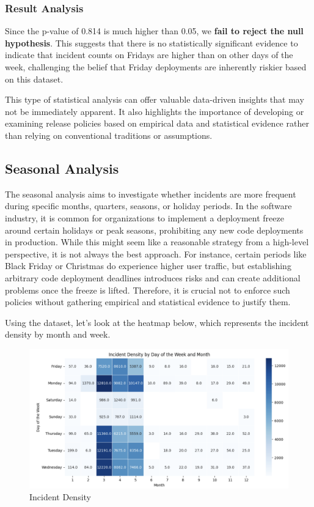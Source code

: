 \documentclass{article}
\begin{document}
\subsubsection{Result Analysis}

Since the p-value of 0.814 is much higher than 0.05, we \textbf{fail to reject the null hypothesis}. This suggests that there is no statistically significant evidence to indicate that incident counts on Fridays are higher than on other days of the week, challenging the belief that Friday deployments are inherently riskier based on this dataset. 

This type of statistical analysis can offer valuable data-driven insights that may not be immediately apparent. It also highlights the importance of developing or examining release policies based on empirical data and statistical evidence rather than relying on conventional traditions or assumptions.

\subsection{Seasonal Analysis}

The seasonal analysis aims to investigate whether incidents are more frequent during specific months, quarters, seasons, or holiday periods. In the software industry, it is common for organizations to implement a deployment freeze around certain holidays or peak seasons, prohibiting any new code deployments in production. While this might seem like a reasonable strategy from a high-level perspective, it is not always the best approach. For instance, certain periods like Black Friday or Christmas do experience higher user traffic, but establishing arbitrary code deployment deadlines introduces risks and can create additional problems once the freeze is lifted. Therefore, it is crucial not to enforce such policies without gathering empirical and statistical evidence to justify them.

Using the dataset, let's look at the heatmap below, which represents the incident density by month and week. 

\begin{figure}[H]
    \centering
    \includegraphics[width=0.7\linewidth]{resources/Screenshot 2024-10-01 233549.png}
    \caption{Incident Density}
    \label{fig:enter-label}
\end{figure}
\end{document}
